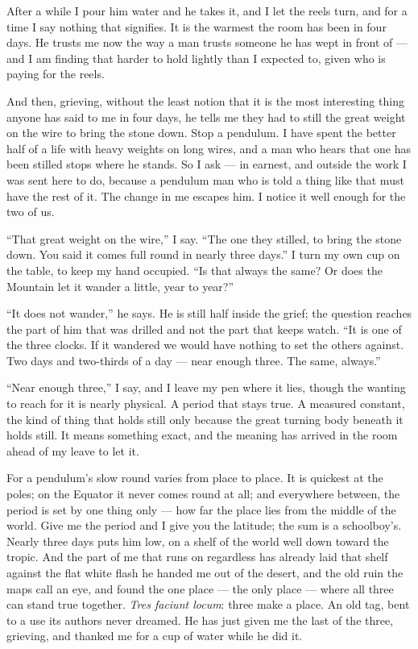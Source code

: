 After a while I pour him water and he takes it, and I let the reels turn, and for a time I say nothing that signifies. It is the warmest the room has been in four days. He trusts me now the way a man trusts someone he has wept in front of --- and I am finding that harder to hold lightly than I expected to, given who is paying for the reels.\par

And then, grieving, without the least notion that it is the most interesting thing anyone has said to me in four days, he tells me they had to still the great weight on the wire to bring the stone down. Stop a pendulum. I have spent the better half of a life with heavy weights on long wires, and a man who hears that one has been stilled stops where he stands. So I ask --- in earnest, and outside the work I was sent here to do, because a pendulum man who is told a thing like that must have the rest of it. The change in me escapes him. I notice it well enough for the two of us.\par

``That great weight on the wire,'' I say. ``The one they stilled, to bring the stone down. You said it comes full round in nearly three days.'' I turn my own cup on the table, to keep my hand occupied. ``Is that always the same? Or does the Mountain let it wander a little, year to year?''\par

``It does not wander,'' he says. He is still half inside the grief; the question reaches the part of him that was drilled and not the part that keeps watch. ``It is one of the three clocks. If it wandered we would have nothing to set the others against. Two days and two-thirds of a day --- near enough three. The same, always.''\par

``Near enough three,'' I say, and I leave my pen where it lies, though the wanting to reach for it is nearly physical. A period that stays true. A measured constant, the kind of thing that holds still only because the great turning body beneath it holds still. It means something exact, and the meaning has arrived in the room ahead of my leave to let it.\par

For a pendulum's slow round varies from place to place. It is quickest at the poles; on the Equator it never comes round at all; and everywhere between, the period is set by one thing only --- how far the place lies from the middle of the world. Give me the period and I give you the latitude; the sum is a schoolboy's. Nearly three days puts him low, on a shelf of the world well down toward the tropic. And the part of me that runs on regardless has already laid that shelf against the flat white flash he handed me out of the desert, and the old ruin the maps call an eye, and found the one place --- the only place --- where all three can stand true together. \textit{Tres faciunt locum}: three make a place. An old tag, bent to a use its authors never dreamed. He has just given me the last of the three, grieving, and thanked me for a cup of water while he did it.\par

